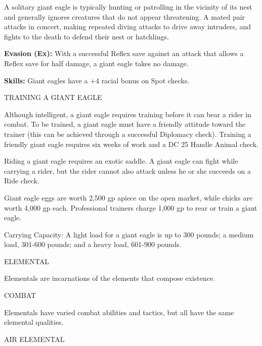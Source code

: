 \documentclass{article}
\begin{document}
A solitary giant eagle is typically hunting or patrolling in the vicinity of its 
nest and generally ignores creatures that do not appear threatening. A mated pair 
attacks in concert, making repeated diving attacks to drive away intruders, and 
fights to the death to defend their nest or hatchlings.

\textbf{Evasion (Ex):} With a successful Reflex save against an attack that allows 
a Reflex save for half damage, a giant eagle takes no damage.

\textbf{Skills:} Giant eagles have a +4 racial bonus on Spot checks. 

TRAINING A GIANT EAGLE

Although intelligent, a giant eagle requires training before it can bear a rider 
in combat. To be trained, a giant eagle must have a friendly attitude toward the 
trainer (this can be achieved through a successful Diplomacy check). Training a 
friendly giant eagle requires six weeks of work and a DC 25 Handle Animal check. 

Riding a giant eagle requires an exotic saddle. A giant eagle can fight while carrying 
a rider, but the rider cannot also attack unless he or she succeeds on a Ride check.

Giant eagle eggs are worth 2,500 gp apiece on the open market, while chicks are 
worth 4,000 gp each. Professional trainers charge 1,000 gp to rear or train a giant 
eagle.

Carrying Capacity: A light load for a giant eagle is up to 300 pounds; a medium 
load, 301-600 pounds; and a heavy load, 601-900 pounds.

\vspace{12pt}
{\LARGE{}ELEMENTAL}

Elementals are incarnations of the elements that compose existence. 

COMBAT

Elementals have varied combat abilities and tactics, but all have the same elemental 
qualities.

AIR ELEMENTAL
\end{document}
